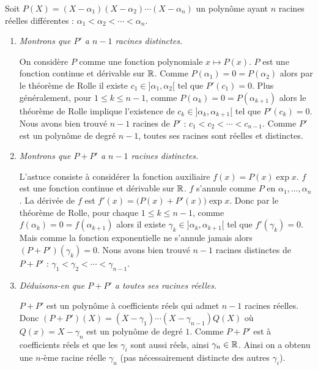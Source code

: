 \documentclass[class=report,crop=false]{standalone}
\begin{document}
\begin{exemple}
Soit $P(X) = (X-\alpha_1)(X-\alpha_2)\cdots(X-\alpha_n)$
un polynôme ayant $n$ racines réelles différentes : $\alpha_1< \alpha_2 < \cdots < \alpha_n$.

\begin{enumerate}
  \item \emph{Montrons que $P'$ a $n-1$ racines distinctes.}

On considère $P$ comme une fonction polynomiale $x \mapsto P(x)$.
$P$ est une fonction continue et dérivable sur $\mathbb{R}$.
Comme $P(\alpha_1)=0=P(\alpha_2)$ alors par le théorème de Rolle
il existe $c_1 \in ]\alpha_1,\alpha_2[$
tel que $P'(c_1)=0$.
Plus généralement, pour $1 \le k \le n-1$, comme $P(\alpha_k)=0=P(\alpha_{k+1})$ alors
le théorème de Rolle implique l'existence de $c_k \in ]\alpha_k,\alpha_{k+1}[$ tel que $P'(c_k)=0$.
Nous avons bien trouvé $n-1$ racines de $P'$ : $c_1< c_2 < \cdots < c_{n-1}$.
Comme $P'$ est un polynôme de degré $n-1$, toutes ses racines sont réelles et distinctes.

  \item \emph{Montrons que $P+P'$ a $n-1$ racines distinctes.}

L'astuce consiste à considérer la fonction auxiliaire $f(x)=P(x)\exp x$.
$f$ est une fonction continue et dérivable sur $\mathbb{R}$.
$f$ s'annule comme $P$ en $\alpha_1,\ldots,\alpha_n$.
La dérivée de $f$ est $f'(x)=\big(P(x)+P'(x)\big) \exp x$.
Donc par le théorème de Rolle, pour chaque  $1 \le k \le n-1$, comme $f(\alpha_k)=0=f(\alpha_{k+1})$ alors
il existe $\gamma_k \in ]\alpha_k,\alpha_{k+1}[$ tel que $f'(\gamma_k)=0$.
Mais comme la fonction exponentielle ne s'annule jamais alors
$(P+P')(\gamma_k)=0$.
Nous avons bien trouvé $n-1$ racines distinctes de $P+P'$ : $\gamma_1 < \gamma_2 < \cdots < \gamma_{n-1}$.



  \item \emph{Déduisons-en que $P+P'$ a toutes ses racines réelles.}

$P+P'$ est un polynôme à coefficients réels qui admet $n-1$ racines réelles.
Donc $(P+P')(X)=(X-\gamma_1)\cdots(X-\gamma_{n-1}) Q(X)$ où $Q(x)=X-\gamma_n$ est un polynôme de degré $1$.
Comme $P+P'$ est à coefficients réels et que les $\gamma_i$ sont aussi réels, ainsi $\gamma_n \in \mathbb{R}$.
Ainsi on a obtenu une $n$-ème racine réelle $\gamma_n$ (pas nécessairement distincte des autres $\gamma_i$).

\end{enumerate}

\end{exemple}
\end{document}
